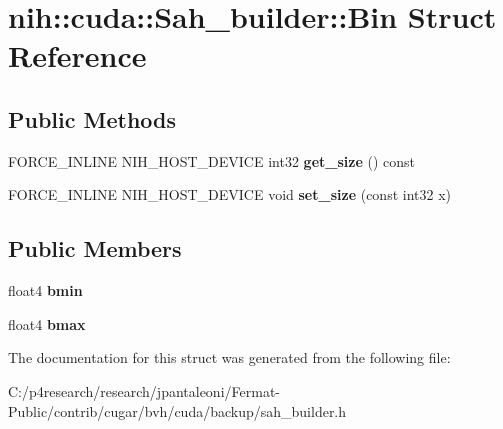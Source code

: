 \hypertarget{structnih_1_1cuda_1_1_sah__builder_1_1_bin}{}\section{nih\+:\+:cuda\+:\+:Sah\+\_\+builder\+:\+:Bin Struct Reference}
\label{structnih_1_1cuda_1_1_sah__builder_1_1_bin}
\subsection*{Public Methods}
\begin{DoxyCompactItemize}
\item 
\mbox{\label{structnih_1_1cuda_1_1_sah__builder_1_1_bin_a9315978e072de6726c1c71b9b7872c7a}} 
F\+O\+R\+C\+E\+\_\+\+I\+N\+L\+I\+NE N\+I\+H\+\_\+\+H\+O\+S\+T\+\_\+\+D\+E\+V\+I\+CE int32 {\bfseries get\+\_\+size} () const
\item 
\mbox{\label{structnih_1_1cuda_1_1_sah__builder_1_1_bin_a8e1d01524a40f8215001e619a54153bb}} 
F\+O\+R\+C\+E\+\_\+\+I\+N\+L\+I\+NE N\+I\+H\+\_\+\+H\+O\+S\+T\+\_\+\+D\+E\+V\+I\+CE void {\bfseries set\+\_\+size} (const int32 x)
\end{DoxyCompactItemize}
\subsection*{Public Members}
\begin{DoxyCompactItemize}
\item 
\mbox{\label{structnih_1_1cuda_1_1_sah__builder_1_1_bin_a50945de37389ef840eb7bbefb57b0d40}} 
float4 {\bfseries bmin}
\item 
\mbox{\label{structnih_1_1cuda_1_1_sah__builder_1_1_bin_a47205ffafe0ef53051ede1d452e6a7d9}} 
float4 {\bfseries bmax}
\end{DoxyCompactItemize}


The documentation for this struct was generated from the following file\+:\begin{DoxyCompactItemize}
\item 
C\+:/p4research/research/jpantaleoni/\+Fermat-\/\+Public/contrib/cugar/bvh/cuda/backup/sah\+\_\+builder.\+h\end{DoxyCompactItemize}
